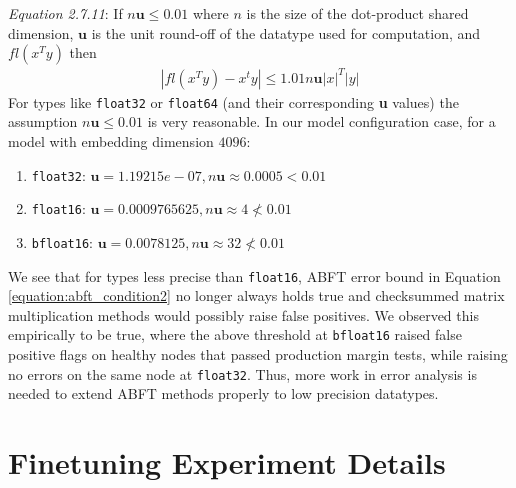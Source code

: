 \emph{Equation 2.7.11}: If $n\mathbf{u} \leq 0.01$ where $n$ is the size of the dot-product shared dimension, $\mathbf{u}$ is the unit round-off of the datatype used for computation, and $fl(x^T y)$ then
\begin{gather*}
    |fl(x^Ty) - x^t y| \leq 1.01 n \mathbf{u} |x|^T|y|
\end{gather*}
For types like \verb|float32| or \verb|float64| (and their corresponding \textbf{u} values) the assumption $n\mathbf{u} \leq 0.01$ is very reasonable. In our model configuration case, for a model with embedding dimension $4096$:
\begin{enumerate}
    \item \verb|float32|: $\mathbf{u}= 1.19215e-07, n\mathbf{u} \approx 0.0005 < 0.01$
    \item \verb|float16|: $\mathbf{u}= 0.0009765625, n\mathbf{u} \approx 4 \nless 0.01$
    \item \verb|bfloat16|: $\mathbf{u}= 0.0078125, n\mathbf{u} \approx 32 \nless 0.01$
\end{enumerate}
We see that for types less precise than \verb|float16|, ABFT error bound in Equation \ref{equation:abft_condition2} no longer always holds true and checksummed matrix multiplication methods would possibly raise false positives. We observed this empirically to be true, where the above threshold at \verb|bfloat16| raised false positive flags on healthy nodes that passed production margin tests, while raising no errors on the same node at \verb|float32|. Thus, more work in error analysis is needed to extend ABFT methods properly to low precision datatypes.

\section{Finetuning Experiment Details} \label{appendix:finetuning}

